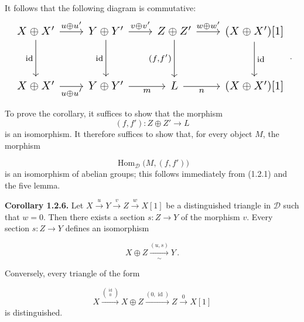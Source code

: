 \clearpage
{}%
\begingroup
\small
\setlength{\abovedisplayskip}{4pt plus 2pt minus 2pt}%
\setlength{\belowdisplayskip}{4pt plus 2pt minus 2pt}%

It follows that the following diagram is commutative:
\begin{equation*}
  \resizebox{0.98\linewidth}{!}{%
    $\begin{tikzcd}[ampersand replacement=\&,column sep=2.1em,row sep=3.1em]
      X\oplus X' \arrow[r,"{u\oplus u'}"] \arrow[d,"{\operatorname{id}}"']
        \& Y\oplus Y' \arrow[r,"{v\oplus v'}"] \arrow[d,"{\operatorname{id}}"']
        \& Z\oplus Z' \arrow[r,"{w\oplus w'}"] \arrow[d,"{(f,f')}"']
        \& (X\oplus X')[1] \arrow[d,"{\operatorname{id}}"] \\
      X\oplus X' \arrow[r,"{u\oplus u'}"']
        \& Y\oplus Y' \arrow[r,"m"']
        \& L \arrow[r,"n"']
        \& (X\oplus X')[1]
    \end{tikzcd}$%
  }\,.
\end{equation*}

To prove the corollary, it suffices to show that the morphism
\[
  (f,f')\colon Z\oplus Z'\longrightarrow L
\]
is an isomorphism. It therefore suffices to show that, for every object $M$,
the morphism

\[
  \operatorname{Hom}_{\mathcal D}\bigl(M,(f,f')\bigr)
\]
is an isomorphism of abelian groups; this follows immediately from (1.2.1)
and the five lemma.


\medskip
\noindent\textbf{Corollary 1.2.6.}\quad
Let
$X\xrightarrow{u}Y\xrightarrow{v}Z\xrightarrow{w}X[1]$
be a distinguished triangle in $\mathcal D$ such that $w=0$. Then there
exists a section $s\colon Z\longrightarrow Y$ of the morphism $v$. Every
section $s\colon Z\longrightarrow Y$ defines an isomorphism

\[
  X\oplus Z\xrightarrow[\sim]{(u,s)}Y\,.
\]

Conversely, every triangle of the form

\begin{equation}
  X\xrightarrow{\binom{\operatorname{id}}{0}}X\oplus Z
  \xrightarrow{(0,\operatorname{id})}Z\xrightarrow{0}X[1]
  \tag{1.2.6.1}
\end{equation}
is distinguished.

